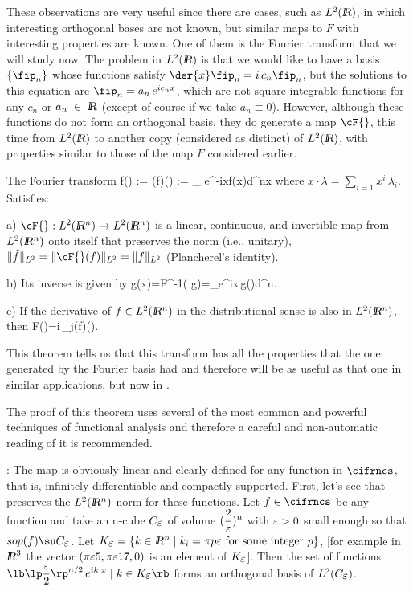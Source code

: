 These observations are very useful since there are cases, such as $L^2(\mbox{\sl {l$\!\!\!\;\:\!$R}})$, 
in which interesting orthogonal bases are not known, but similar maps
to $F$ with interesting properties are known. 
One of them is the
Fourier transform that we will study now. 
The problem in $L^2(\mbox{\sl {l$\!\!\!\;\:\!$R}})$
is that we would like to have a basis $\{\fip_n\}$ whose functions 
satisfy $\dip\der{x}\fip_n=i\,c_n\fip_n$,
but the solutions to this equation are $\fip_n=a_n\,e^{ic_nx}$, 
which are not square-integrable functions for any $c_n$ or $a_n \;\in \; \mbox{\sl {l$\!\!\!\;\:\!$R}}$  
(except of course if we take $a_n\equiv 0$). However, although
these functions do not form an orthogonal 
basis, they do generate a map $\cF{}$, this time from $L^2(\mbox{\sl {l$\!\!\!\;\:\!$R}})$ 
to another copy (considered as distinct) of $L^2(\mbox{\sl {l$\!\!\!\;\:\!$R}})$,
with properties similar to those of the map $F$
considered earlier.

 The Fourier transform 
\beq
\hat f(\lambda) := \cF{} (f)(\lambda) := \int_{\ren{}}
e^{-ix\cdot\lambda}\;f(x)\;d^nx 
\eeq
%
where  $x\cdot\lambda=\sum_{i=1}x^i\,\lambda_i$. \\

Satisfies: 
\espa

\noi a) $\cF{} :L^2(\ren{})\to L^2(\ren{})$
is a linear, continuous, and invertible map from $L^2(\mbox{\sl {l$\!\!\!\;\:\!$R}$^n$}{})$ onto itself that
preserves the norm (i.e., unitary),
$\|\hat f\|_{L^2}=\|\cF{}(f)\|_{L^2}=\|f\|_{L^2}$ (Plancherel's identity).

\espa
\noi b) Its inverse is given by
\beq
\check g(x)={\cal F}^{-1}(\hat
g)=\int_{\ren{}}e^{ix\cdot \lambda}\,\hat g(\lambda)\;d^n\lambda.
\eeq

\espa
\noi c) If the derivative of $f\in L^2(\mbox{\sl {l$\!\!\!\;\:\!$R}$^n$}{})$ in the distributional sense is
also in $L^2(\mbox{\sl {l$\!\!\!\;\:\!$R}$^n$}{})$, then
\beq
{\cal F}\lp{}\rp(\lambda)=i\,\lambda_j(f)(\lambda).
\eeq
\eteo

This theorem tells us that this transform has all
the properties that the one generated by the Fourier basis had and
therefore will be as useful as that one in similar applications, but
now in \ren{}.

The proof of this theorem uses several of the most common and
powerful techniques of functional analysis and therefore a
careful and non-automatic reading of it is recommended.


\espa
\pru: 
The map \cF{} is obviously linear and clearly defined
for any function in $\cifrncs$, that is, infinitely differentiable
and compactly supported. First, let's see that \cF{} preserves the $L^2(\mbox{\sl {l$\!\!\!\;\:\!$R}$^n$}{})$ norm 
for these functions. 
Let $f\in\cifrncs$ be any function and take an n-cube $C_{\mbox{$\varepsilon$}}$ of
volume $(\displaystyle\frac{2}{\mbox{$\varepsilon$}})^n$ with $\mbox{$\varepsilon$}>0$ small enough 
so that $sop(f)\su C_{\eps}$.
Let $K_{\mbox{$\varepsilon$}}=\{k\in\mbox{\sl {l$\!\!\!\;\:\!$R}$^n$}{} \;|\;k_i=\pi p\mbox{$\varepsilon$}\mbox{ for some integer } 
p\}$, [for example in $\mbox{\sl {l$\!\!\!\;\:\!$R}}^3$ the vector $(\pi\mbox{$\varepsilon$} 5,\pi\mbox{$\varepsilon$}17,0)$ is an
element of $K_{\mbox{$\varepsilon$}}$]. 
Then the set of functions 
$\lb\lp\dip\frac{\eps}2\rp^{n/2}\,e^{ik\cdot x}\;|\;k\in K_{\eps}\rb$ 
forms an orthogonal basis
of $L^2(C_{\mbox{$\varepsilon$}})$.

